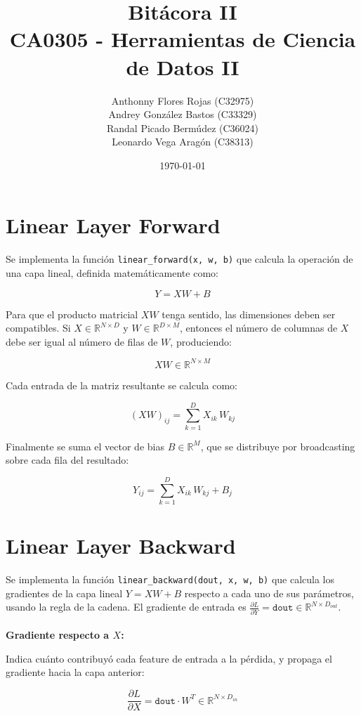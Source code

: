 \documentclass[12pt, letterpaper]{article}
\title
{
    Bitácora II \\[1ex] 
\large CA0305 - Herramientas de Ciencia de Datos II
}
\author{Anthonny Flores Rojas (C32975)\\ Andrey González Bastos (C33329)\\ Randal Picado Bermúdez (C36024)\\ Leonardo Vega Aragón (C38313) }
\date{\today}
\begin{document}
    
\maketitle


\newpage

\section{Linear Layer Forward}

Se implementa la función \texttt{linear\_forward(x, w, b)} que calcula la operación de una capa lineal, definida matemáticamente como:

\[
Y = XW + B
\]

Para que el producto matricial $XW$ tenga sentido, las dimensiones deben ser compatibles. Si $X \in \mathbb{R}^{N \times D}$ y $W \in \mathbb{R}^{D \times M}$, entonces el número de columnas de $X$ debe ser igual al número de filas de $W$, produciendo:

\[
XW \in \mathbb{R}^{N \times M}
\]

Cada entrada de la matriz resultante se calcula como:

\[
(XW)_{ij} = \sum_{k=1}^{D} X_{ik} \, W_{kj}
\]

Finalmente se suma el vector de bias $B \in \mathbb{R}^{M}$, que se distribuye por broadcasting sobre cada fila del resultado:

\[
Y_{ij} = \sum_{k=1}^{D} X_{ik} \, W_{kj} + B_j
\]


\newpage


\section{Linear Layer Backward}

Se implementa la función \texttt{linear\_backward(dout, x, w, b)} que calcula los gradientes de la capa lineal $Y = XW + B$ respecto a cada uno de sus parámetros, usando la regla de la cadena. El gradiente de entrada es $\frac{\partial L}{\partial Y} = \texttt{dout} \in \mathbb{R}^{N \times D_{out}}$. \\ \\ 


\textbf{Gradiente respecto a $X$:}

Indica cuánto contribuyó cada feature de entrada a la pérdida, y propaga el gradiente hacia la capa anterior:

\[
\frac{\partial L}{\partial X} = \texttt{dout} \cdot W^T \in \mathbb{R}^{N \times D_{in}}
\] \\ \\
\end{document}
